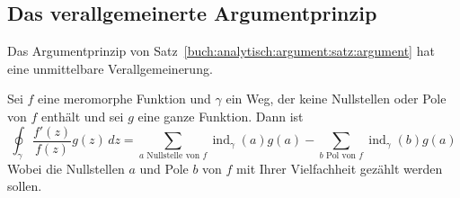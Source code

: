 %
%
%
\subsection{Das verallgemeinerte Argumentprinzip
\label{buch:analytisch:argument:subsection:verallgemeinert}}
Das Argumentprinzip von Satz~\ref{buch:analytisch:argument:satz:argument}
hat eine unmittelbare Verallgemeinerung.

\begin{satz}
%
Sei $f$ eine meromorphe Funktion und $\gamma$ ein Weg, der keine Nullstellen
oder Pole von $f$ enthält und sei $g$ eine ganze Funktion.
Dann ist
\[
\oint_\gamma \frac{f'(z)}{f(z)} g(z)\,dz
=
\sum_{\text{$a$ Nullstelle von $f$}} \operatorname{ind}_\gamma(a) g(a)
-
\sum_{\text{$b$ Pol von $f$}} \operatorname{ind}_\gamma(b) g(a)
\]
Wobei die Nullstellen $a$ und Pole $b$ von $f$ mit Ihrer Vielfachheit
gezählt werden sollen.
\end{satz}

